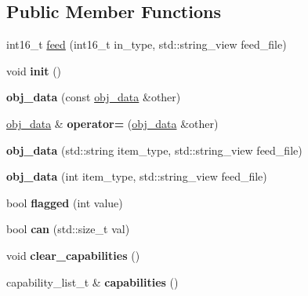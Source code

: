\subsection*{Public Member Functions}
\begin{DoxyCompactItemize}
\item 
int16\+\_\+t \hyperlink{structobj__data_a3d7da4441c8008b81092e8382bbcff35}{feed} (int16\+\_\+t in\+\_\+type, std\+::string\+\_\+view feed\+\_\+file)
\item 
\mbox{\label{structobj__data_a14f475c7d4aa30563cacad1229a1f654}} 
void {\bfseries init} ()
\item 
\mbox{\label{structobj__data_aa1788a59d6b458a141dd5c63d19b3ecf}} 
{\bfseries obj\+\_\+data} (const \hyperlink{structobj__data}{obj\+\_\+data} \&other)
\item 
\mbox{\label{structobj__data_aef8b0442976e05a1e4967d8a63565d71}} 
\hyperlink{structobj__data}{obj\+\_\+data} \& {\bfseries operator=} (\hyperlink{structobj__data}{obj\+\_\+data} \&other)
\item 
\mbox{\label{structobj__data_a3d291ed2d2a1e26c6abf5ff228fa296d}} 
{\bfseries obj\+\_\+data} (std\+::string item\+\_\+type, std\+::string\+\_\+view feed\+\_\+file)
\item 
\mbox{\label{structobj__data_aa64aa8b7829789988220521123aa7d7a}} 
{\bfseries obj\+\_\+data} (int item\+\_\+type, std\+::string\+\_\+view feed\+\_\+file)
\item 
\mbox{\label{structobj__data_ab87c2b9c4cee66d19853733c5919caba}} 
bool {\bfseries flagged} (int value)
\item 
\mbox{\label{structobj__data_afc408145d963e0014301a55b77063900}} 
bool {\bfseries can} (std\+::size\+\_\+t val)
\item 
\mbox{\label{structobj__data_a3b74355068b8924a0c3b67c339597bed}} 
void {\bfseries clear\+\_\+capabilities} ()
\item 
\mbox{\label{structobj__data_a707a4e8ebf545b2a926acdf9f9d9b89e}} 
capability\+\_\+list\+\_\+t \& {\bfseries capabilities} ()

\end{DoxyCompactItemize}
